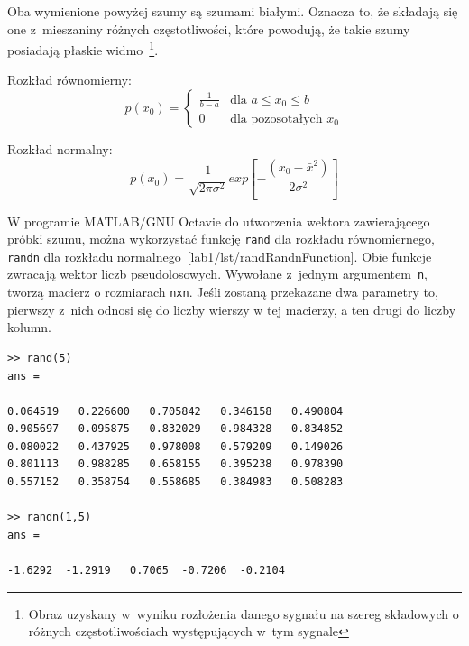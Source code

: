 Oba wymienione powyżej szumy są szumami białymi. Oznacza to, że składają się one z~mieszaniny różnych częstotliwości, które powodują, że takie szumy posiadają płaskie widmo~\footnote{Obraz uzyskany w~wyniku rozłożenia danego sygnału na szereg składowych o różnych częstotliwościach występujących w~tym sygnale}.


Rozkład równomierny:
\begin{equation}\label{lab1/eq/uniformDistribution}
	p(x_0) =
	\begin{cases} 
		\frac{1}{b-a} & \text{dla $a  \leq  x_0  \leq  b$} \\
		0 & \text{dla pozosotałych $x_0$}
	\end{cases}
\end{equation}

Rozkład normalny:
\begin{equation}\label{lab1/eq/normalDistribution}
	p(x_0) = \frac{1}{\sqrt{2\pi\sigma^2}} exp\left[-\frac{(x_0 - \bar{x}^2)}{2\sigma^2} \right]
\end{equation}

W programie MATLAB/GNU Octavie do utworzenia wektora zawierającego próbki szumu, można wykorzystać funkcję \texttt{rand} dla rozkładu równomiernego, \texttt{randn} dla rozkładu normalnego~\ref{lab1/lst/randRandnFunction}. Obie funkcje zwracają wektor liczb pseudolosowych. Wywołane z~jednym argumentem~\texttt{n}, tworzą macierz o rozmiarach \texttt{nxn}. Jeśli zostaną przekazane dwa parametry to, pierwszy z~nich odnosi się do liczby wierszy w tej macierzy, a ten drugi do liczby kolumn. 

\begin{lstlisting}[caption=Tworzenie macierzy/wektora liczb pseudolosowych z~wykorzystaniem funkcji \texttt{rand} oraz \texttt{randn} , label=lab1/lst/randRandnFunction]
>> rand(5)
ans =

0.064519   0.226600   0.705842   0.346158   0.490804
0.905697   0.095875   0.832029   0.984328   0.834852
0.080022   0.437925   0.978008   0.579209   0.149026
0.801113   0.988285   0.658155   0.395238   0.978390
0.557152   0.358754   0.558685   0.384983   0.508283

>> randn(1,5)
ans =

-1.6292  -1.2919   0.7065  -0.7206  -0.2104
\end{lstlisting} 

